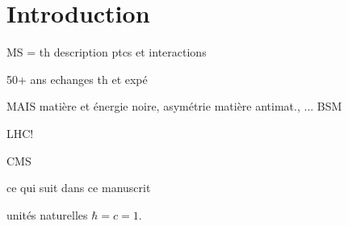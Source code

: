 \chapter{Introduction}\label{chapter-introduction}

MS = th description ptcs et interactions

50+ ans echanges th et expé

MAIS matière et énergie noire, asymétrie matière antimat., ... BSM

LHC!

CMS

\og ce qui suit dans ce manuscrit \fg{} 

unités naturelles $\hbar=c=1$.
